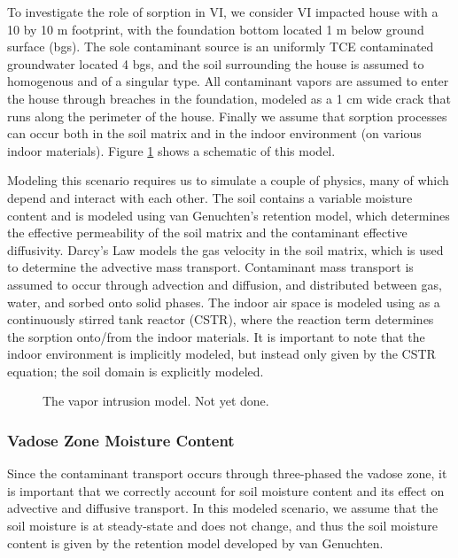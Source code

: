 To investigate the role of sorption in VI, we consider VI impacted house with a 10 by 10 m footprint, with the foundation bottom located 1 m below ground surface (bgs).
The sole contaminant source is an uniformly TCE contaminated groundwater located 4 bgs, and the soil surrounding the house is assumed to homogenous and of a singular type.
All contaminant vapors are assumed to enter the house through breaches in the foundation, modeled as a 1 cm wide crack that runs along the perimeter of the house.
Finally we assume that sorption processes can occur both in the soil matrix and in the indoor environment (on various indoor materials).
Figure \ref{fig:model} shows a schematic of this model.\par

Modeling this scenario requires us to simulate a couple of physics, many of which depend and interact with each other.
The soil contains a variable moisture content and is modeled using van Genuchten's retention model\cite{van_genuchten_closed-form_1980}, which determines the effective permeability of the soil matrix and the contaminant effective diffusivity.
Darcy's Law models the gas velocity in the soil matrix, which is used to determine the advective mass transport.
Contaminant mass transport is assumed to occur through advection and diffusion, and distributed between gas, water, and sorbed onto solid phases.
The indoor air space is modeled using as a continuously stirred tank reactor (CSTR), where the reaction term determines the sorption onto/from the indoor materials.
It is important to note that the indoor environment is implicitly modeled, but instead only given by the CSTR equation; the soil domain is explicitly modeled.\par

\begin{figure}
  \caption{The vapor intrusion model. Not yet done.}
  \label{fig:model}
\end{figure}

\subsubsection{Vadose Zone Moisture Content}

Since the contaminant transport occurs through three-phased the vadose zone, it is important that we correctly account for soil moisture content and its effect on advective and diffusive transport.
In this modeled scenario, we assume that the soil moisture is at steady-state and does not change, and thus the soil moisture content is given by the retention model developed by van Genuchten\cite{van_genuchten_closed-form_1980}.\par

